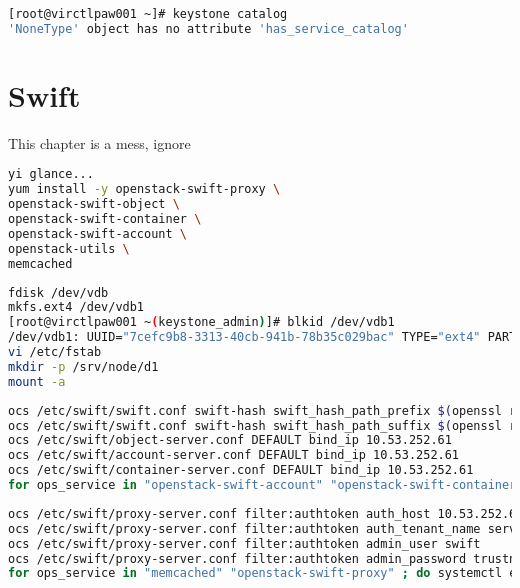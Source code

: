 \documentclass[11pt,letterpaper,oneside]{book}
\begin{document}
\begin{lstlisting}[caption={Keystone Error Message},language=bash]
[root@virctlpaw001 ~]# keystone catalog 
'NoneType' object has no attribute 'has_service_catalog'
\end{lstlisting}

\chapter{Swift}

\begin{huge} \danger \end{huge} This chapter is a mess, ignore
\begin{lstlisting}[caption={Install Swift},language=bash]
yi glance...
yum install -y openstack-swift-proxy \
openstack-swift-object \
openstack-swift-container \
openstack-swift-account \
openstack-utils \
memcached
\end{lstlisting}

\begin{lstlisting}[caption={Install Swift},language=bash]
fdisk /dev/vdb
mkfs.ext4 /dev/vdb1 
[root@virctlpaw001 ~(keystone_admin)]# blkid /dev/vdb1 
/dev/vdb1: UUID="7cefc9b8-3313-40cb-941b-78b35c029bac" TYPE="ext4" PARTUUID="9faed234-01" 
vi /etc/fstab 
mkdir -p /srv/node/d1
mount -a
\end{lstlisting}

\begin{lstlisting}[caption={Swift account, container, object},language=bash]
ocs /etc/swift/swift.conf swift-hash swift_hash_path_prefix $(openssl rand -hex 10)
ocs /etc/swift/swift.conf swift-hash swift_hash_path_suffix $(openssl rand -hex 10)
ocs /etc/swift/object-server.conf DEFAULT bind_ip 10.53.252.61
ocs /etc/swift/account-server.conf DEFAULT bind_ip 10.53.252.61
ocs /etc/swift/container-server.conf DEFAULT bind_ip 10.53.252.61
for ops_service in "openstack-swift-account" "openstack-swift-container" "openstack-swift-object"; do systemctl enable $ops_service; systemctl start $ops_service; done
\end{lstlisting}


\begin{lstlisting}[caption={Swift Proxy},language=bash]
ocs /etc/swift/proxy-server.conf filter:authtoken auth_host 10.53.252.61
ocs /etc/swift/proxy-server.conf filter:authtoken auth_tenant_name service
ocs /etc/swift/proxy-server.conf filter:authtoken admin_user swift
ocs /etc/swift/proxy-server.conf filter:authtoken admin_password trustn01
for ops_service in "memcached" "openstack-swift-proxy" ; do systemctl enable $ops_service; systemctl start $ops_service; done
\end{lstlisting}
\end{document}
